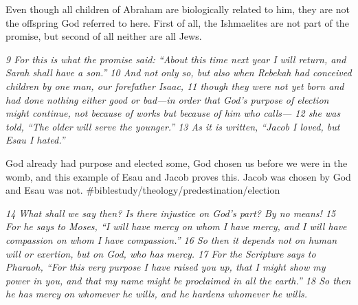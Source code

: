 Even though all children of Abraham are biologically related to him,
they are not the offspring God referred to here. First of all, the
Ishmaelites are not part of the promise, but second of all neither are
all Jews.

\emph{9 For this is what the promise said: ``About this time next year I
will return, and Sarah shall have a son.'' 10 And not only so, but also
when Rebekah had conceived children by one man, our forefather Isaac, 11
though they were not yet born and had done nothing either good or
bad---in order that God's purpose of election might continue, not
because of works but because of him who calls--- 12 she was told, ``The
older will serve the younger.'' 13 As it is written, ``Jacob I loved,
but Esau I hated.''}

God already had purpose and elected some, God chosen us before we were
in the womb, and this example of Esau and Jacob proves this. Jacob was
chosen by God and Esau was not.
\#biblestudy/theology/predestination/election

\emph{14 What shall we say then? Is there injustice on God's part? By no
means! 15 For he says to Moses, ``I will have mercy on whom I have
mercy, and I will have compassion on whom I have compassion.'' 16 So
then it depends not on human will or exertion, but on God, who has
mercy. 17 For the Scripture says to Pharaoh, ``For this very purpose I
have raised you up, that I might show my power in you, and that my name
might be proclaimed in all the earth.'' 18 So then he has mercy on
whomever he wills, and he hardens whomever he wills.}

